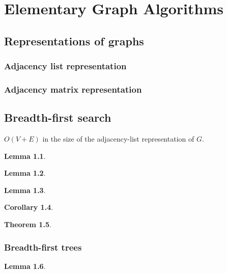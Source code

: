 \documentclass[letter]{book}
\theoremstyle{definition}
\newtheorem{theorem}{Theorem}[chapter]
\newtheorem{lemma}[theorem]{Lemma}
\newtheorem{corollary}[theorem]{Corollary}
\theoremstyle{definition}
\theoremstyle{remark}
\begin{document}
\setcounter{chapter}{21}

\chapter{Elementary Graph Algorithms}

\section{Representations of graphs}
\subsection{Adjacency list representation}
\subsection{Adjacency matrix representation}

\section{Breadth-first search}
$O(V+E)$ in the size of the adjacency-list representation of $G$.
\bigskip
\begin{lemma}

\end{lemma}
\bigskip
\begin{lemma}

\end{lemma}
\bigskip
\begin{lemma}

\end{lemma}
\bigskip
\begin{corollary}

\end{corollary}
\bigskip
\begin{theorem}

\end{theorem}
\subsection{Breadth-first trees}
\begin{lemma}

\end{lemma}
\end{document}
